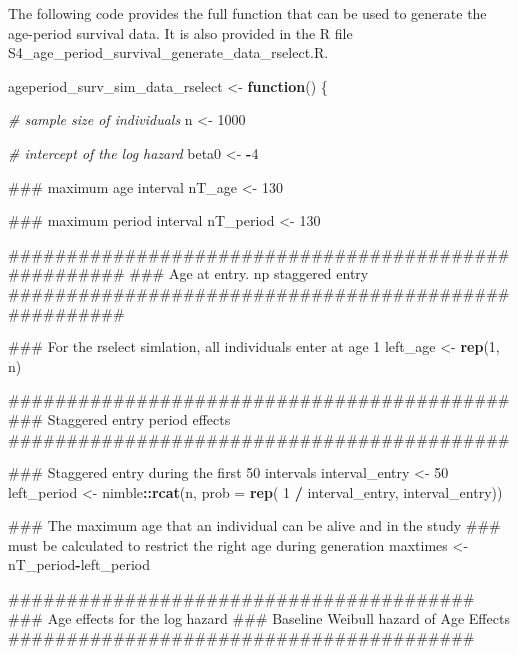 \documentclass[11pt,]{article}
\newenvironment{Shaded}{\begin{snugshade}}{\end{snugshade}}
\newcommand{\KeywordTok}[1]{\textcolor[rgb]{0.13,0.29,0.53}{\textbf{#1}}}
\newcommand{\DataTypeTok}[1]{\textcolor[rgb]{0.13,0.29,0.53}{#1}}
\newcommand{\DecValTok}[1]{\textcolor[rgb]{0.00,0.00,0.81}{#1}}
\newcommand{\StringTok}[1]{\textcolor[rgb]{0.31,0.60,0.02}{#1}}
\newcommand{\CommentTok}[1]{\textcolor[rgb]{0.56,0.35,0.01}{\textit{#1}}}
\newcommand{\ControlFlowTok}[1]{\textcolor[rgb]{0.13,0.29,0.53}{\textbf{#1}}}
\newcommand{\OperatorTok}[1]{\textcolor[rgb]{0.81,0.36,0.00}{\textbf{#1}}}
\newcommand{\NormalTok}[1]{#1}
\begin{document}
The following code provides the full function that can be used to
generate the age-period survival data. It is also provided in the R file
S4\_age\_period\_survival\_generate\_data\_rselect.R.

\begin{Shaded}
\begin{Highlighting}[]
\NormalTok{ageperiod_surv_sim_data_rselect <-}\StringTok{ }\ControlFlowTok{function}\NormalTok{() \{}

  \CommentTok{# sample size of individuals}
\NormalTok{  n <-}\StringTok{ }\DecValTok{1000}

  \CommentTok{# intercept of the log hazard}
\NormalTok{  beta0 <-}\StringTok{ }\OperatorTok{-}\DecValTok{4}

\NormalTok{  ### maximum age interval}
\NormalTok{  nT_age <-}\StringTok{ }\DecValTok{130}

\NormalTok{  ### maximum period interval}
\NormalTok{  nT_period <-}\StringTok{ }\DecValTok{130}

\NormalTok{  #####################################################}
\NormalTok{  ### Age at entry. np staggered entry}
\NormalTok{  #####################################################}

\NormalTok{  ### For the rselect simlation, all individuals enter at age 1}
\NormalTok{  left_age <-}\StringTok{ }\KeywordTok{rep}\NormalTok{(}\DecValTok{1}\NormalTok{, n)}

\NormalTok{  ###########################################}
\NormalTok{  ### Staggered entry period effects}
\NormalTok{  ###########################################}

\NormalTok{  ### Staggered entry during the first 50 intervals}
\NormalTok{  interval_entry <-}\StringTok{ }\DecValTok{50}
\NormalTok{  left_period <-}\StringTok{ }\NormalTok{nimble}\OperatorTok{::}\KeywordTok{rcat}\NormalTok{(n, }\DataTypeTok{prob =} \KeywordTok{rep}\NormalTok{( }\DecValTok{1} \OperatorTok{/}\StringTok{ }\NormalTok{interval_entry, interval_entry))}

\NormalTok{  ### The maximum age that an individual can be alive and in the study}
\NormalTok{  ### must be calculated to restrict the right age during generation}
\NormalTok{  maxtimes <-}\StringTok{ }\NormalTok{nT_period}\OperatorTok{-}\NormalTok{left_period}

\NormalTok{  ########################################}
\NormalTok{  ### Age effects for the log hazard}
\NormalTok{  ### Baseline Weibull hazard of Age Effects}
\NormalTok{  ########################################}


\end{Highlighting}
\end{Shaded}
\end{document}
